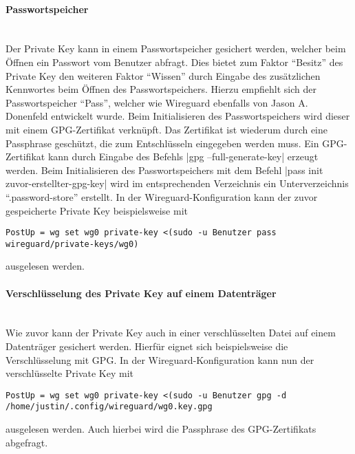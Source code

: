 \paragraph{Passwortspeicher} 
\noindent \\Der Private Key kann in einem Passwortspeicher gesichert werden, welcher beim \"Offnen ein Passwort vom Benutzer abfragt. Dies bietet zum Faktor "`Besitz"' des Private Key den weiteren Faktor "`Wissen"' durch Eingabe des zus\"atzlichen Kennwortes beim \"Offnen des Passwortspeichers. Hierzu empfiehlt sich der Passwortspeicher "`Pass"', welcher wie Wireguard ebenfalls von Jason A. Donenfeld entwickelt wurde. Beim Initialisieren des Passwortspeichers wird dieser mit einem GPG-Zertifikat verknüpft. Das Zertifikat ist wiederum durch eine Passphrase gesch\"utzt, die zum Entschlüsseln eingegeben werden muss.
Ein GPG-Zertifikat kann durch Eingabe des Befehls |gpg --full-generate-key| erzeugt werden. Beim Initialisieren des Passwortspeichers mit dem Befehl |pass init zuvor-erstellter-gpg-key| wird im entsprechenden Verzeichnis ein Unterverzeichnis \enquote{.password-store} erstellt. In der Wireguard-Konfiguration kann der zuvor gespeicherte Private Key beispielsweise mit 
\begin{verbatim}
PostUp = wg set wg0 private-key <(sudo -u Benutzer pass wireguard/private-keys/wg0)
\end{verbatim}
ausgelesen werden.

\paragraph{Verschl\"usselung des Private Key auf einem Datentr\"ager}
\noindent \\Wie zuvor kann der Private Key auch in einer verschl\"usselten Datei auf einem Datentr\"ager gesichert werden. Hierfür eignet sich beispielsweise die Verschl\"usselung mit GPG. In der Wireguard-Konfiguration kann nun der verschl\"usselte Private Key mit 
\begin{verbatim}
PostUp = wg set wg0 private-key <(sudo -u Benutzer gpg -d /home/justin/.config/wireguard/wg0.key.gpg
\end{verbatim}
ausgelesen werden. Auch hierbei wird die Passphrase des GPG-Zertifikats abgefragt. 

